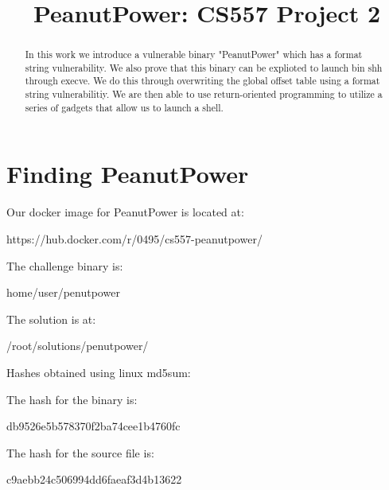\documentclass[10pt, conference, letterpaper]{IEEEtran}
\begin{document}
\graphicspath{ {images/} }
\newcommand{\sysname}{ModiPick\xspace}
\newcommand{\Brittany}[1]{{\color{red}\textbf{Brittany: \textit{#1}}}}
\newcommand{\sam}[1]{{\color{blue}\textbf{Sam: \textit{#1}}}}
\newcommand{\eat}[1]{}



\title{PeanutPower: CS557 Project 2
}

\author{
\and
{}
}



\maketitle

\begin{abstract}
In this work we introduce a vulnerable binary "PeanutPower" which has a format string vulnerability. We also prove that this binary can be explioted to launch bin shh through execve. We do this through overwriting the global offset table using a format string vulnerabilitiy. We are then able to use return-oriented programming to utilize a series of gadgets that allow us to launch a shell.
\end{abstract}

\section{Finding PeanutPower}
Our docker image for PeanutPower is located at:

https://hub.docker.com/r/0495/cs557-peanutpower/

The challenge binary is:

 home/user/penutpower

The solution is at:

/root/solutions/penutpower/

Hashes obtained using linux md5sum:

The hash for the binary is:

db9526e5b578370f2ba74cee1b4760fc

The hash for the source file is:

 c9aebb24c506994dd6faeaf3d4b13622










%
%
\end{document}
